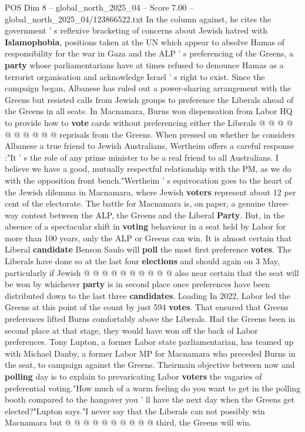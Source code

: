 \begin{textsample}{POS Dim 8 – global\_north\_2025\_04 – Score 7.00 – global\_north\_2025\_04/123866522.txt}
In the column against, he cites the government ' s reflexive bracketing of concerns about Jewish hatred with \textbf{Islamophobia}, positions taken at the UN which appear to absolve Hamas of responsibility for the war in Gaza and the ALP ' s preferencing of the Greens, a \textbf{party} whose parliamentarians have at times refused to denounce Hamas as a terrorist organisation and acknowledge Israel ' s right to exist.
Since the campaign began, Albanese has ruled out a power-sharing arrangement with the Greens but resisted calls from Jewish groups to preference the Liberals ahead of the Greens in all seats.
In Macnamara, Burns won dispensation from Labor HQ to provide how to \textbf{vote} cards without preferencing either the Liberals @ @ @ @ @ @ @ @ @ @ reprisals from the Greens.
When pressed on whether he considers Albanese a true friend to Jewish Australians, Wertheim offers a careful response :"It ' s the role of any prime minister to be a real friend to all Australians.
I believe we have a good, mutually respectful relationship with the PM, as we do with the opposition front bench."Wertheim ' s equivocation goes to the heart of the Jewish dilemma in Macnamara, where Jewish \textbf{voters} represent about 12 per cent of the electorate.
The battle for Macnamara is, on paper, a genuine three-way contest between the ALP, the Greens and the Liberal \textbf{Party}.
But, in the absence of a spectacular shift in \textbf{voting} behaviour in a seat held by Labor for more than 100 years, only the ALP or Greens can win.
It is almost certain that Liberal \textbf{candidate} Benson Saulo will \textbf{poll} the most first preference \textbf{votes}.
The Liberals have done so at the last four \textbf{elections} and should again on 3 May, particularly if Jewish @ @ @ @ @ @ @ @ @ @ also near certain that the seat will be won by whichever \textbf{party} is in second place once preferences have been distributed down to the last three \textbf{candidates}.
Loading In 2022, Labor led the Greens at this point of the count by just 594 \textbf{votes}.
That ensured that Greens preferences lifted Burns comfortably above the Liberals.
Had the Greens been in second place at that stage, they would have won off the back of Labor preferences.
Tony Lupton, a former Labor state parliamentarian, has teamed up with Michael Danby, a former Labor MP for Macnamara who preceded Burns in the seat, to campaign against the Greens.
Theirmain objective between now and \textbf{polling} day is to explain to prevaricating Labor \textbf{voters} the vagaries of preferential voting."How much of a warm feeling do you want to get in the polling booth compared to the hangover you ' ll have the next day when the Greens get elected?"Lupton says."I never say that the Liberals can not possibly win Macnamara but @ @ @ @ @ @ @ @ @ @ third, the Greens will win.

\end{textsample}
